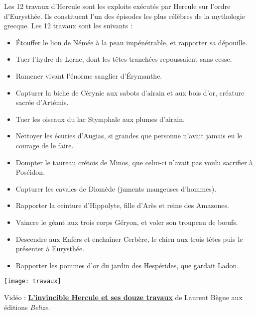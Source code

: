 \begin{debat} 
   Les 12 travaux d'Hercule sont les exploits exécutés par Hercule sur l'ordre d'Eurysthée. Ils constituent l'un des épisodes les plus célèbres de la mythologie grecque. Les 12 travaux sont les suivants :
   \begin{itemize}
      \item Étouffer le lion de Némée à la peau impénétrable, et rapporter sa dépouille.
      \item Tuer l'hydre de Lerne, dont les têtes tranchées repoussaient sans cesse.
      \item Ramener vivant l'énorme sanglier d'Érymanthe.
      \item Capturer la biche de Cérynie aux sabots d'airain et aux bois d'or, créature sacrée d'Artémis.
      \item Tuer les oiseaux du lac Stymphale aux plumes d'airain.
      \item Nettoyer les écuries d'Augias, si grandes que personne n'avait jamais eu le courage de le faire.
      \item Dompter le taureau crétois de Minos, que celui-ci n'avait pas voulu sacrifier à Poséidon.
      \item Capturer les cavales de Diomède (juments mangeuses d'hommes).
      \item Rapporter la ceinture d'Hippolyte, fille d'Arès et reine des Amazones.
      \item Vaincre le géant aux trois corps Géryon, et voler son troupeau de bœufs.
      \item Descendre aux Enfers et enchaîner Cerbère, le chien aux trois têtes puis le présenter à Eurysthée.
      \item Rapporter les pommes d'or du jardin des Hespérides, que gardait Ladon.
   \end{itemize}
   \begin{center} 
      \texttt{[image: travaux]}
   \end{center}
   \begin{cadre}[B2][F4]
      \begin{center}
         Vidéo : \href{https://www.youtube.com/watch?v=NWgaJvStk6U}{\bf L'invincible Hercule et ses douze travaux} de Laurent Bègue aux éditions {\it Belize}.
      \end{center}
   \end{cadre}
\end{debat}

\vfill

